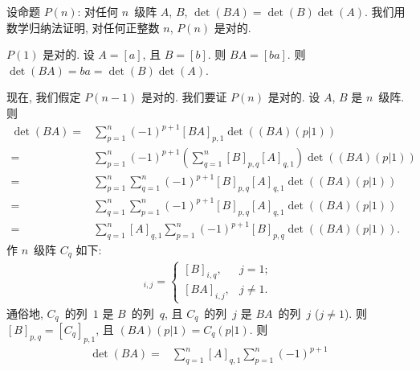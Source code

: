 \documentclass[../libro.tex]{subfiles}
\begin{document}
\begin{example}
    设命题 \(P(n)\):
    对任何 \(n\)~级阵 \(A\), \(B\),
    \(\det {(BA)} = \det {(B)} \det {(A)}\).
    我们用数学归纳法证明,
    对任何正整数 \(n\), \(P(n)\) 是对的.

    \(P(1)\) 是对的.
    设 \(A = [a]\), 且 \(B = [b]\).
    则 \(BA = [ba]\).
    则 \(\det {(BA)} = ba = \det {(B)} \det {(A)}\).

    现在, 我们假定 \(P(n-1)\) 是对的.
    我们要证 \(P(n)\) 是对的.
    设 \(A\), \(B\) 是 \(n\)~级阵.
    则
    \begin{align*}
        \det {(BA)}
        = {} &
        \sum_{p=1}^{n} {
            (-1)^{p+1} [BA]_{p,1} \det {((BA)(p|1))}
        }
        \\
        = {} &
        \sum_{p=1}^{n} {
            (-1)^{p+1}
            \left(
                \sum_{q=1}^{n} {
                    [B]_{p,q} [A]_{q,1}
                }
            \right)
            \det {((BA)(p|1))}
        }
        \\
        = {} &
        \sum_{p=1}^{n} {
            \sum_{q=1}^{n} {
                (-1)^{p+1}
                [B]_{p,q} [A]_{q,1}
                \det {((BA)(p|1))}
            }
        }
        \\
        = {} &
        \sum_{q=1}^{n} {
            \sum_{p=1}^{n} {
                (-1)^{p+1}
                [B]_{p,q} [A]_{q,1}
                \det {((BA)(p|1))}
            }
        }
        \\
        = {} &
        \sum_{q=1}^{n} {
            [A]_{q,1}
            \sum_{p=1}^{n} {
                (-1)^{p+1}
                [B]_{p,q}
                \det {((BA)(p|1))}
            }
        }.
    \end{align*}
    作 \(n\)~级阵 \(C_q\) 如下:
    \begin{align*}
        [C_q]_{i,j} =
        \begin{cases}
            [B]_{i,q},  & j = 1;    \\
            [BA]_{i,j}, & j \neq 1.
        \end{cases}
    \end{align*}
    通俗地, \(C_q\)~的列~\(1\) 是 \(B\)~的列~\(q\),
    且 \(C_q\)~的列~\(j\) 是 \(BA\)~的列~\(j\)
    (\(j \neq 1\)).
    则 \([B]_{p,q} = [C_q]_{p,1}\),
    且 \((BA)(p|1) = C_q (p|1)\).
    则
    \begin{align*}
        \det {(BA)}
        = {} &
        \sum_{q=1}^{n} {
            [A]_{q,1}
            \sum_{p=1}^{n} {
                (-1)^{p+1}
}}
\end{align*}
\end{example}
\end{document}
